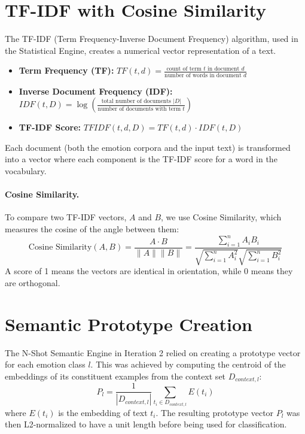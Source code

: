 \section{TF-IDF with Cosine Similarity}

The TF-IDF (Term Frequency-Inverse Document Frequency) algorithm, used in the Statistical Engine, creates a numerical vector representation of a text.
\begin{itemize}
    \item \textbf{Term Frequency (TF):} $TF(t, d) = \frac{\text{count of term } t \text{ in document } d}{\text{number of words in document } d}$
    \item \textbf{Inverse Document Frequency (IDF):} $IDF(t, D) = \log\left(\frac{\text{total number of documents } |D|}{\text{number of documents with term } t}\right)$
    \item \textbf{TF-IDF Score:} $TFIDF(t, d, D) = TF(t, d) \cdot IDF(t, D)$
\end{itemize}
Each document (both the emotion corpora and the input text) is transformed into a vector where each component is the TF-IDF score for a word in the vocabulary.

\paragraph{Cosine Similarity.} To compare two TF-IDF vectors, $A$ and $B$, we use Cosine Similarity, which measures the cosine of the angle between them:
\begin{equation}
\text{Cosine Similarity}(A, B) = \frac{A \cdot B}{\|A\| \|B\|} = \frac{\sum_{i=1}^{n} A_i B_i}{\sqrt{\sum_{i=1}^{n} A_i^2} \sqrt{\sum_{i=1}^{n} B_i^2}}
\end{equation}
A score of 1 means the vectors are identical in orientation, while 0 means they are orthogonal.

\section{Semantic Prototype Creation}

The N-Shot Semantic Engine in Iteration 2 relied on creating a prototype vector for each emotion class $l$. This was achieved by computing the centroid of the embeddings of its constituent examples from the context set $D_{context, l}$:
\begin{equation}
 P_l = \frac{1}{|D_{context, l}|} \sum_{t_i \in D_{context, l}} E(t_i)
\end{equation}
where $E(t_i)$ is the embedding of text $t_i$. The resulting prototype vector $P_l$ was then L2-normalized to have a unit length before being used for classification.

